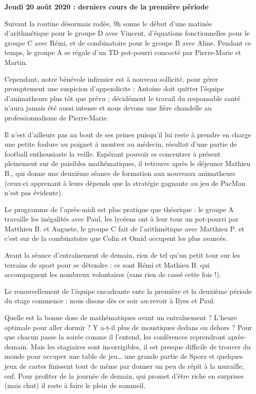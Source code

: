 \begin{center}
{\textbf{Jeudi 20 août 2020 : derniers cours de la première période}}
\end{center}
\vspace{2mm}


Suivant la routine désormais rodée, 9h sonne le début d’une matinée d’arithmétique pour le groupe D avec Vincent, d’équations fonctionnelles pour le groupe C avec Rémi, et de combinatoire pour le groupe B avec Aline. Pendant ce temps, le groupe A se régale d’un TD pot-pourri concocté par Pierre-Marie et Martin.


Cependant, notre bénévole infirmier est à nouveau sollicité, pour gérer promptement une suspicion d’appendicite : Antoine doit quitter l’équipe d’animatheurs plus tôt que prévu  ; décidément le travail du responsable santé n’aura jamais été aussi intense et nous devons une fière chandelle au professionnalisme de Pierre-Marie.

Il n’est d’ailleurs pas au bout de ses peines puisqu’il lui reste à prendre en charge une petite foulure au poignet à montrer au médecin, résultat d’une partie de football enthousiaste la veille. Espérant pouvoir se concentrer à présent pleinement sur de paisibles mathématiques, il retrouve après le déjeuner Mathieu B., qui donne une deuxième séance de formation aux nouveaux animatheurs (ceux-ci apprenant à leurs dépends que la stratégie gagnante au jeu de PacMan n’est pas évidente).


Le programme de l’après-midi est plus pratique que théorique : le groupe A travaille les inégalités avec Paul, les lycéens ont à leur tour un pot-pourri par Matthieu B. et Auguste, le groupe C fait de l’arithmétique avec Matthieu P. et c’est sur de la combinatoire que Colin et Omid occupent les plus avancés.


Avant la séance d’entraînement de demain, rien de tel qu’un petit tour sur les terrains de sport pour se détendre : ce sont Rémi et Mathieu B. qui accompagnent les nombreux volontaires (sans rien de cassé cette fois !).



Le renouvellement de l’équipe encadrante ente la première et la deuxième période du stage commence : nous disons dès ce soir au-revoir à Ilyes et Paul.

Quelle est la bonne dose de mathématiques avant un entraînement ? L’heure optimale pour aller dormir ? Y a-t-il plus de moustiques dedans ou dehors ? Pour que chacun passe la soirée comme il l’entend, les conférences reprendront après-demain. Mais les stagiaires sont incorrigibles, il est presque difficile de trouver du monde pour occuper une table de jeu… une grande partie de Sporz et quelques jeux de cartes finissent tout de même par donner un peu de répit à la muraille, ouf. Pour profiter de la journée de demain, qui promet d’être riche en surprises (mais chut) il reste à faire le plein de sommeil.
